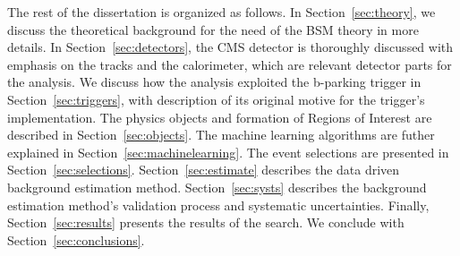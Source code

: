 The rest of the dissertation is organized as follows.
In Section~\ref{sec:theory}, we discuss the theoretical background for the need of the BSM theory in more details. 
In Section~\ref{sec:detectors}, the CMS detector is thoroughly discussed with emphasis on the tracks and the calorimeter, which are relevant detector parts for the analysis. 
We discuss how the analysis exploited the b-parking trigger in Section~\ref{sec:triggers}, with description of its original motive for the trigger's implementation. 
The physics objects and formation of Regions of Interest are described in Section~\ref{sec:objects}.
The machine learning algorithms are futher explained in Section~\ref{sec:machinelearning}. 
The event selections are presented in Section~\ref{sec:selections}. 
Section~\ref{sec:estimate} describes the data driven background estimation method. 
Section~\ref{sec:systs} describes the background estimation method's validation process and systematic uncertainties.
Finally, Section~\ref{sec:results} presents the results of the search.
We conclude with Section~\ref{sec:conclusions}.
